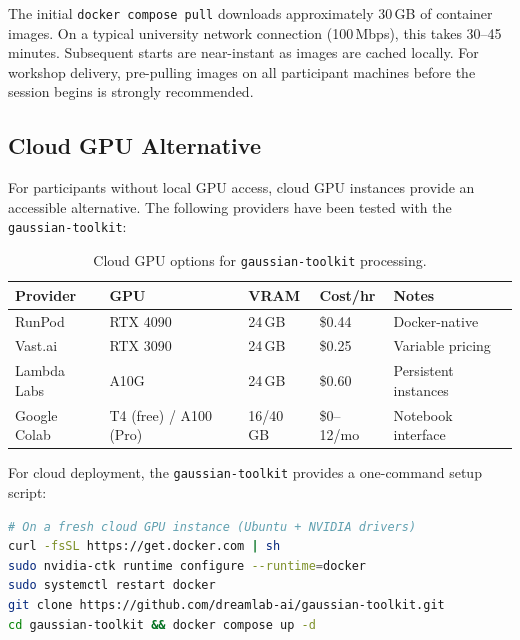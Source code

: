 \begin{technote}
The initial \texttt{docker compose pull} downloads approximately 30\,GB of container images. On a typical university network connection (100\,Mbps), this takes 30--45 minutes. Subsequent starts are near-instant as images are cached locally. For workshop delivery, pre-pulling images on all participant machines before the session begins is strongly recommended.
\end{technote}

\subsection{Cloud GPU Alternative}

For participants without local GPU access, cloud GPU instances provide an accessible alternative. The following providers have been tested with the \texttt{gaussian-toolkit}:

\begin{table}[htbp]
  \centering
  \caption{Cloud GPU options for \texttt{gaussian-toolkit} processing.}
  \label{tab:cloud-gpu}
  \begin{tabular}{@{}L{2.5cm}L{3cm}L{2.5cm}L{2cm}L{2.5cm}@{}}
    \toprule
    \textbf{Provider} & \textbf{GPU} & \textbf{VRAM} & \textbf{Cost/hr} & \textbf{Notes} \\
    \midrule
    RunPod       & RTX 4090     & 24\,GB & \$0.44 & Docker-native \\
    Vast.ai      & RTX 3090     & 24\,GB & \$0.25 & Variable pricing \\
    Lambda Labs  & A10G         & 24\,GB & \$0.60 & Persistent instances \\
    Google Colab & T4 (free) / A100 (Pro) & 16/40\,GB & \$0--12/mo & Notebook interface \\
    \bottomrule
  \end{tabular}
\end{table}

For cloud deployment, the \texttt{gaussian-toolkit} provides a one-command setup script:

\begin{lstlisting}[language=bash, caption={Cloud instance quick setup.}, label={lst:cloud-setup}]
# On a fresh cloud GPU instance (Ubuntu + NVIDIA drivers)
curl -fsSL https://get.docker.com | sh
sudo nvidia-ctk runtime configure --runtime=docker
sudo systemctl restart docker
git clone https://github.com/dreamlab-ai/gaussian-toolkit.git
cd gaussian-toolkit && docker compose up -d
\end{lstlisting}

